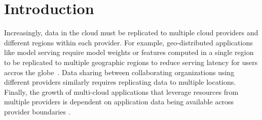\section{Introduction}



Increasingly, data in the cloud must be replicated to multiple cloud providers and different regions within each provider.
% 
For example, geo-distributed applications like model serving require model weights or features computed in a single region to be replicated to multiple geographic regions to reduce serving latency for users accros the globe~\cite{flinn2022owl,sima2022ekko,wu2013spanstore}.
% 
Data sharing between collaborating organizations using different providers similarly requires replicating data to multiple locations.
% 
Finally, the growth of multi-cloud applications that leverage resources from multiple providers is dependent on application data being available across provider boundaries \cite{chasins2022sky, skypilot, wu2013spanstore}. 


